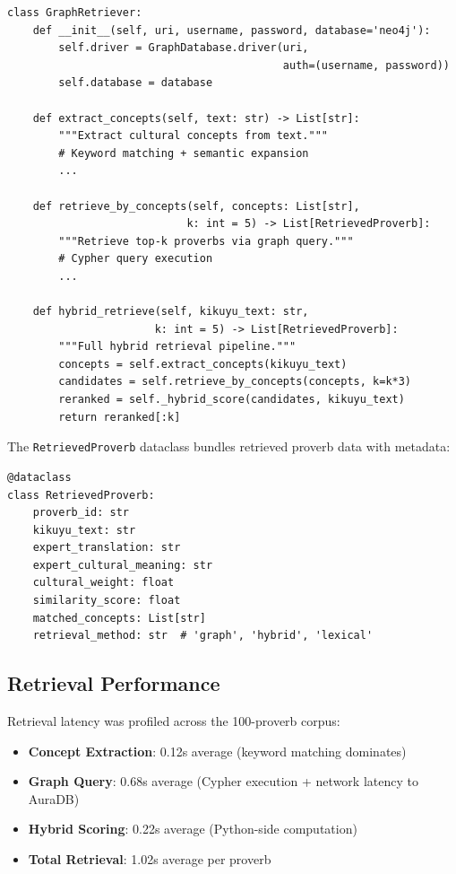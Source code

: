 \begin{verbatim}
class GraphRetriever:
    def __init__(self, uri, username, password, database='neo4j'):
        self.driver = GraphDatabase.driver(uri, 
                                           auth=(username, password))
        self.database = database
    
    def extract_concepts(self, text: str) -> List[str]:
        """Extract cultural concepts from text."""
        # Keyword matching + semantic expansion
        ...
    
    def retrieve_by_concepts(self, concepts: List[str], 
                            k: int = 5) -> List[RetrievedProverb]:
        """Retrieve top-k proverbs via graph query."""
        # Cypher query execution
        ...
    
    def hybrid_retrieve(self, kikuyu_text: str, 
                       k: int = 5) -> List[RetrievedProverb]:
        """Full hybrid retrieval pipeline."""
        concepts = self.extract_concepts(kikuyu_text)
        candidates = self.retrieve_by_concepts(concepts, k=k*3)
        reranked = self._hybrid_score(candidates, kikuyu_text)
        return reranked[:k]
\end{verbatim}

The \texttt{RetrievedProverb} dataclass bundles retrieved proverb data with metadata:
\begin{verbatim}
@dataclass
class RetrievedProverb:
    proverb_id: str
    kikuyu_text: str
    expert_translation: str
    expert_cultural_meaning: str
    cultural_weight: float
    similarity_score: float
    matched_concepts: List[str]
    retrieval_method: str  # 'graph', 'hybrid', 'lexical'
\end{verbatim}

\subsection{Retrieval Performance}
\label{subsec:retrieval_performance}

Retrieval latency was profiled across the 100-proverb corpus:
\begin{itemize}
    \item \textbf{Concept Extraction}: 0.12s average (keyword matching dominates)
    \item \textbf{Graph Query}: 0.68s average (Cypher execution + network latency to AuraDB)
    \item \textbf{Hybrid Scoring}: 0.22s average (Python-side computation)
    \item \textbf{Total Retrieval}: 1.02s average per proverb
\end{itemize}

